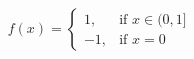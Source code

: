 \documentclass[preview]{standalone}
\begin{document}
\begin{align*}
f(x) = \begin{cases} 1, & \text{if } x \in (0, 1] \\ -1, & \text{if } x = 0 \end{cases}
\end{align*}
\end{document}
